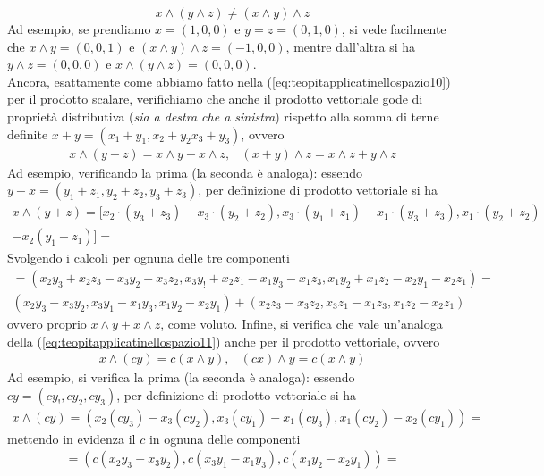 \begin{equation*}
  x\wedge (y\wedge z)\neq (x\wedge y) \wedge z
\end{equation*}
Ad esempio, se prendiamo $x=(1,0,0)$ e $y=z=(0,1,0)$, si vede facilmente che $x\wedge y = (0,0,1)$ e $(x\wedge y) \wedge z=(-1,0,0)$, mentre dall'altra si ha $y\wedge z=(0,0,0)$ e $x\wedge (y\wedge z)=(0,0,0)$.\\
Ancora, esattamente come abbiamo fatto nella (\ref{eq:teopitapplicatinellospazio10}) per il prodotto scalare, verifichiamo che anche il prodotto vettoriale gode di proprietà distributiva (\textit{sia a destra che a sinistra}) rispetto alla somma di terne definite $x+y=(x_1+y_1,x_2+y_2x_3+y_3)$, ovvero
\begin{eqnarray}
  \label{eq:teopitapplicatinellospazio13}
  x\wedge (y+z)=x\wedge y +x \wedge z, & (x+y)\wedge z= x\wedge z+y\wedge z
\end{eqnarray}
Ad esempio, verificando la prima (la seconda è analoga): essendo $y+x=(y_1+z_1,y_2+z_2,y_3+z_3)$, per definizione di prodotto vettoriale si ha
\begin{eqnarray*}
  x\wedge (y+z)= [x_2\cdot(y_3+z_3)-x_3\cdot(y_2+z_2),x_3\cdot(y_1+z_1)
  -x_1\cdot (y_3+z_3),x_1\cdot(y_2+z_2)\\-x_2(y_1+z_1)]=
\end{eqnarray*}
Svolgendo i calcoli per ognuna delle tre componenti
\begin{eqnarray*}
  =(x_2y_3+x_2z_3-x_3y_2-x_3z_2,x_3y_!+x_2z_1-x_1y_3-x_1z_3, x_1y_2+x_1z_2-x_2y_1-x_2z_1)=\\
  (x_2y_3-x_3y_2,x_3y_1-x_1y_3,x_1y_2-x_2y_1)+(x_2z_3-x_3z_2,x_3z_1-x_1z_3,x_1z_2-x_2z_1)
\end{eqnarray*}
ovvero proprio $x\wedge y+x\wedge z$, come voluto. Infine, si verifica che vale un'analoga della (\ref{eq:teopitapplicatinellospazio11}) anche per il prodotto vettoriale, ovvero
\begin{eqnarray}
  \label{eq:teopitapplicatinellospazio14}
  x\wedge (cy)=c(x\wedge y), & (cx)\wedge y =c(x\wedge y)
\end{eqnarray}
Ad esempio, si verifica la prima (la seconda è analoga): essendo $cy=(cy_!,cy_2,cy_3)$, per definizione di prodotto vettoriale si ha
\begin{eqnarray*}
  x\wedge (cy)=(x_2(cy_3)-x_3(cy_2),x_3(cy_1)-x_1(cy_3),x_1(cy_2)-x_2(cy_1))=
\end{eqnarray*}
mettendo in evidenza il $c$ in ognuna delle componenti
\begin{eqnarray*}
  =(c(x_2y_3-x_3y_2),c(x_3y_1-x_1y_3),c(x_1y_2-x_2y_1))=
\end{eqnarray*}

